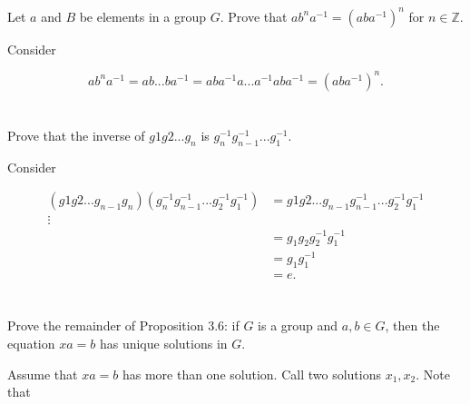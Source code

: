\documentclass[a4paper]{article}
\begin{document}
\section{}


\section{}

Let $a$ and $B$ be elements in a group $G$. Prove that $ab^na^{-1} = (aba^{-1})^n$ for $n \in \mathbb{Z}$.

\vspace{\baselineskip}

Consider

$$ab^na^{-1} = a b ... b  a^{-1} = a  b a^{-1} a ... a^{-1} a b a^{-1} = (aba^{-1})^n.$$


\section{}


\section{}

Prove that the inverse of $g1 g2 ... g_n$ is $g_n^{-1} g_{n-1}^{-1} ... g_1^{-1}$.

\vspace{\baselineskip}

Consider

\begin{align*}
(g1 g2 ... g_{n-1} g_n) (g_n^{-1} g_{n-1}^{-1} ... g_2^{-1} g_1^{-1}) &= g1 g2 ... g_{n-1} g_{n-1}^{-1} ... g_2^{-1} g_1^{-1} \\
\vdots \\
&= g_1 g_2 g_2^{-1} g_1^{-1} \\
&= g_1 g_1^{-1} \\
&= e.
\end{align*}


\section{}

Prove the remainder of Proposition 3.6: if $G$ is a group and $a,b \in G$, then the equation $xa = b$ has unique solutions in $G$.

\vspace{\baselineskip}

Assume that $xa = b$ has more than one solution. Call two solutions $x_1, x_2$. Note that 
\end{document}
